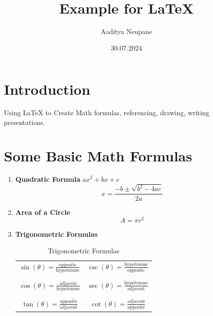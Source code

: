 \documentclass{article}
\title{Example for LaTeX}
\author{Aaditya Neupane}
\date{30.07.2024}
\begin{document}
\maketitle

\section{Introduction}
Using LaTeX to Create Math formulas, referencing, drawing, writing \\ presentations.



\section{Some Basic Math Formulas}
\begin{enumerate}
    \item \textbf{Quadratic Formula} $ax^2+bx+c$
    $$ x = \frac{-b \pm \sqrt{b^2 - 4ac}}{2a} $$
    \item \textbf{Area of a Circle}
    $$A = \pi r^2$$
    \item \textbf{Trigonometric Formulas}
    \begin{table}[h]
        \centering
        \begin{tabular}{c|c}
        
            \(\sin(\theta) = \frac{\text{opposite}}{\text{hypotenuse}}\) & \(\csc(\theta) = \frac{\text{hypotenuse}}{\text{opposite}}\)  \\ \\ \hline \\
            \(\cos(\theta) = \frac{\text{adjacent}}{\text{hypotenuse}}\) & \(\sec(\theta) = \frac{\text{hypotenuse}}{\text{adjacent}}\) \\ \\ \hline \\
            \(\tan(\theta) = \frac{\text{opposite}}{\text{adjacent}}\) & \(\cot(\theta) = \frac{\text{adjacent}}{\text{opposite}}\) \\
        \end{tabular}
        \caption{Trigonometric Formulas}
    \end{table}
\end{enumerate}
\end{document}
